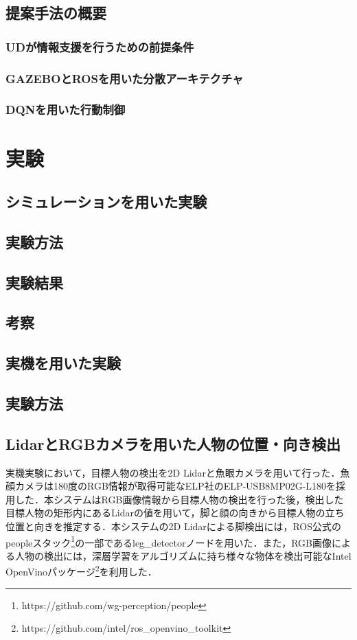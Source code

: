 \documentclass[12pt]{sonota/aislab}
\begin{document}
\section{提案手法の概要}
\subsection{UDが情報支援を行うための前提条件}
\subsection{GAZEBOとROSを用いた分散アーキテクチャ}
\subsection{DQNを用いた行動制御}

\chapter{実験}
\section{シミュレーションを用いた実験}
\section{実験方法}
\section{実験結果}
\section{考察}
\section{実機を用いた実験}
\section{実験方法}
\section{LidarとRGBカメラを用いた人物の位置・向き検出}
実機実験において，目標人物の検出を2D Lidarと魚眼カメラを用いて行った．魚顔カメラは180度のRGB情報が取得可能なELP社のELP-USB8MP02G-L180を採用した．本システムはRGB画像情報から目標人物の検出を行った後，検出した目標人物の矩形内にあるLidarの値を用いて，脚と顔の向きから目標人物の立ち位置と向きを推定する．本システムの2D Lidarによる脚検出には，ROS公式のpeopleスタック\footnote{https://github.com/wg-perception/people}の一部であるleg\_detectorノードを用いた．また，RGB画像による人物の検出には，深層学習をアルゴリズムに持ち様々な物体を検出可能なIntel OpenVinoパッケージ\footnote{https://github.com/intel/ros\_openvino\_toolkit}を利用した．
\end{document}
